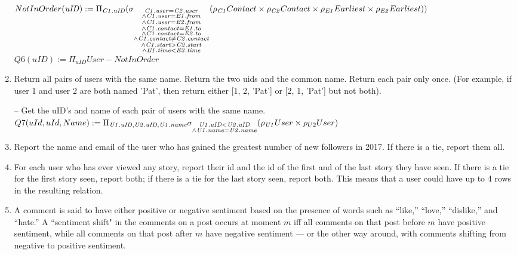\documentclass{article}
\newcommand{\var}[1]{\mathit{#1}}
\begin{document}
\begin{enumerate}
{$
NotInOrder(\var{uID}) := \\ [5pt]
	\Pi_{\var{C1.uID}}
	(\sigma_{\substack{\var{C1.user} = \var{C2.user} \\
		\wedge \var{C1.user} = \var{E1.from} \\
		\wedge \var{C1.user} = \var{E2.from} \\
		\wedge \var{C1.contact} = \var{E1.to} \\
		\wedge \var{C1.contact} = \var{E2.to} \\
		\wedge \var{C1.contact} \neq \var{C2.contact} \\
		\wedge \var{C1.start} > \var{C2.start} \\
		\wedge \var{E1.time} < \var{E2.time}}}
		(\rho_{\var{C1}} Contact \times \rho_{\var{C2}} Contact
		\times \rho_{\var{E1}} Earliest \times \rho_{\var{E2}} Earliest)) \\ [5pt]
$
$
Q6(uID) := 
	\Pi_{\var{uID}} User - NotInOrder
$
}
\item   %
Return all pairs of users with the same name. Return the two uids and the common name. Return
each pair only once. (For example, if user 1 and user 2 are both named 'Pat', then return either [1, 2,
'Pat'] or [2, 1, 'Pat'] but not both). \\ [5pt]
\large{
\hspace*{1cm} -- Get the uID's and name of each pair of users with the same name. \\ [5 pt]
$
Q7(uId, uId, Name) := \Pi_{\var{U1.uID}, \var{U2.uID}, \var{U1.name}}
	 \sigma_{\substack{{\var{U1.uID}}  <  \var{U2.uID} \\
	  \wedge \var{U1.name} = \var{U2.name}}} (\rho_{\var{U1}} User \times \rho_{U2}User) \\ [5pt]
$

}
\item   %
Report the name and email of the user
who has gained the greatest number of new followers in 2017. 
If there is a tie, report them all.

\item   %
For each user who has ever viewed any story, 
	report their id and the id of the first and of the last story they have seen.
If there is a tie for the first story seen, report both;
if there is a tie for the last story seen, report both.
This means that a user could have up to 4 rows in the resulting relation.

\item   %
A comment is said to have either positive or negative sentiment
based on the presence of words such as ``like,'' ``love,'' ``dislike,'' and ``hate.'' 
A ``sentiment shift" in the comments on a post occurs at moment $m$ iff
all comments on that post before $m$ have positive sentiment, 
while all comments on that post after $m$ have negative sentiment ---
or the other way around, with comments shifting from negative to positive sentiment.


\end{enumerate}
\end{document}
